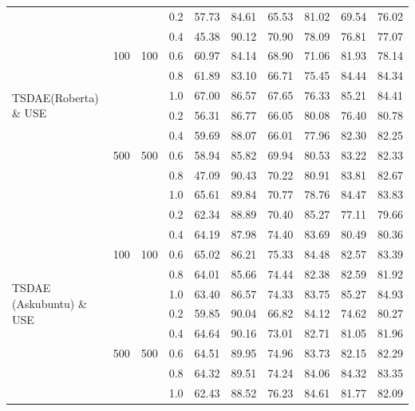 \documentclass[journal,letterpaper]{IEEEtran}
\begin{document}
\begin{table}[!ht]
\begin{tabular}{l c c c c c c c c c}
\multirow{10}{*}{TSDAE(Roberta) \& USE}
& \multirow{5}{*}{100} & \multirow{5}{*}{100} & 0.2 & 57.73 & 84.61 & 65.53 & 81.02 & 69.54 & 76.02 \\
& & & 0.4 & 45.38 & 90.12 & 70.90 & 78.09 & 76.81 & 77.07 \\
& & & 0.6 & 60.97 & 84.14 & 68.90 & 71.06 & 81.93 & 78.14 \\
& & & 0.8 & 61.89 & 83.10 & 66.71 & 75.45 & 84.44 & 84.34 \\
& & & 1.0 & 67.00 & 86.57 & 67.65 & 76.33 & 85.21 & 84.41 \\
\addlinespace
& \multirow{5}{*}{500} & \multirow{5}{*}{500} & 0.2 & 56.31 & 86.77 & 66.05 & 80.08 & 76.40 & 80.78 \\
& & & 0.4 & 59.69 & 88.07 & 66.01 & 77.96 & 82.30 & 82.25 \\
& & & 0.6 & 58.94 & 85.82 & 69.94 & 80.53 & 83.22 & 82.33 \\
& & & 0.8 & 47.09 & 90.43 & 70.22 & 80.91 & 83.81 & 82.67 \\
& & & 1.0 & 65.61 & 89.84 & 70.77 & 78.76 & 84.47 & 83.83 \\
\midrule

\multirow{10}{*}{TSDAE (Askubuntu) \& USE}
& \multirow{5}{*}{100} & \multirow{5}{*}{100} & 0.2 & 62.34 & 88.89 & 70.40 & 85.27 & 77.11 & 79.66 \\
& & & 0.4 & 64.19 & 87.98 & 74.40 & 83.69 & 80.49 & 80.36 \\
& & & 0.6 & 65.02 & 86.21 & 75.33 & 84.48 & 82.57 & 83.39 \\
& & & 0.8 & 64.01 & 85.66 & 74.44 & 82.38 & 82.59 & 81.92 \\
& & & 1.0 & 63.40 & 86.57 & 74.33 & 83.75 & 85.27 & 84.93 \\
\addlinespace
& \multirow{5}{*}{500} & \multirow{5}{*}{500} & 0.2 & 59.85 & 90.04 & 66.82 & 84.12 & 74.62 & 80.27 \\
& & & 0.4 & 64.64 & 90.16 & 73.01 & 82.71 & 81.05 & 81.96 \\
& & & 0.6 & 64.51 & 89.95 & 74.96 & 83.73 & 82.15 & 82.29 \\
& & & 0.8 & 64.32 & 89.51 & 74.24 & 84.06 & 84.32 & 83.35 \\
& & & 1.0 & 62.43 & 88.52 & 76.23 & 84.61 & 81.77 & 82.09 \\
\midrule


\end{tabular}
\end{table}
\end{document}
